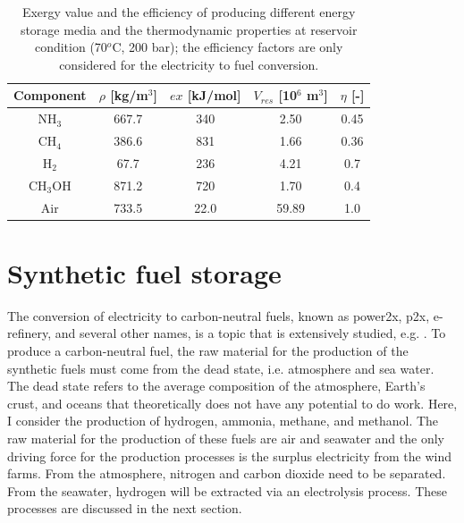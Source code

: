 \documentclass{ECOS_2021}
\begin{document}
\begin{table}[h]
\normalsize
\caption{\label{tab:Exergy-value-efficiency}Exergy value and the efficiency
of producing different energy storage media and the thermodynamic
properties at reservoir condition (70$^{o}$C, 200 bar); the efficiency
factors are only considered for the electricity to fuel conversion.}

\begin{center}
\begin{tabular}{ccccc}
\hline 
Component & $\rho$ {[}kg/m$^{3}${]} & $ex$ {[}kJ/mol{]} & $V_{res}$ {[}10$^{6}$ m$^{3}${]} & $\eta$ {[}-{]}\tabularnewline
\hline 
NH$_{3}$ & 667.7 & 340 & 2.50 & 0.45\tabularnewline
CH$_{4}$ & 386.6 & 831 & 1.66 & 0.36\tabularnewline
H$_{2}$ & 67.7 & 236 & 4.21 & 0.7\tabularnewline
CH$_{3}$OH & 871.2 & 720 & 1.70 & 0.4\tabularnewline
Air & 733.5 & 22.0 & 59.89 & 1.0\tabularnewline
\hline 
\end{tabular}
\end{center}
\end{table}

\sffamily \section{Synthetic fuel storage}
\normalsize

The conversion of electricity to carbon-neutral fuels, known as power2x,
p2x, e-refinery, and several other names, is a topic that is extensively
studied, e.g. \cite{freiMethanolHydrogenCarrier2020b,
ghaibPowertoMethaneStateoftheartReview2018,guerraMethaneProductionCombined2018,
koponenReviewWaterElectrolysis2015,mendoza-hernandezExergyValorizationWater2019}.
To produce a carbon-neutral fuel, the raw material for the production
of the synthetic fuels must come from the dead state, i.e. atmosphere
and sea water. The dead state refers to the average composition of
the atmosphere, Earth's crust, and oceans that theoretically does
not have any potential to do work. Here, I consider the production
of hydrogen, ammonia, methane, and methanol. The raw material for
the production of these fuels are air and seawater and the only driving
force for the production processes is the surplus electricity from
the wind farms. From the atmosphere, nitrogen and carbon dioxide need
to be separated. From the seawater, hydrogen will be extracted via
an electrolysis process. These processes are discussed in the next
section.
\end{document}
